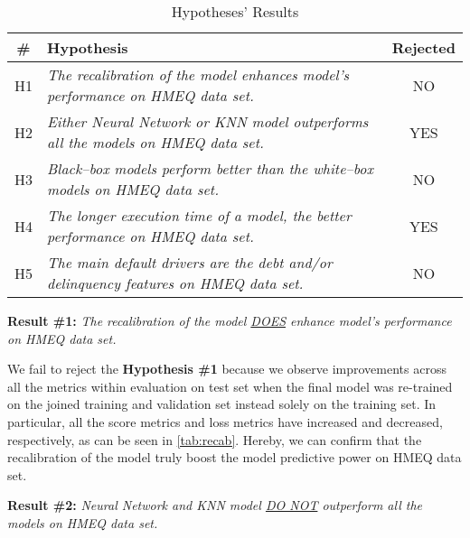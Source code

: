 \begin{table}[H]
    \small
    \setlength{\tabcolsep}{8pt}
    \centering
    \caption[Hypotheses' Results]{Hypotheses' Results}\label{tab:hypoconclusion}
    \renewcommand{\arraystretch}{1.5}
    \begin{tabular}{c p{10cm} c}
    \toprule
    \textbf{\#} & \textbf{Hypothesis} & \textbf{Rejected} \\
    \midrule
    \hline
    H1 & \textit{The recalibration of the model enhances model's performance on HMEQ data set.} & NO \\
    H2 & \textit{Either Neural Network or KNN model outperforms all the models on HMEQ data set.} & YES \\
    H3 & \textit{Black--box models perform better than the white--box models on HMEQ data set.} & NO \\
    H4 & \textit{The longer execution time of a model, the better performance on HMEQ data set.} & YES \\
    H5 & \textit{The main default drivers are the debt and/or delinquency features on HMEQ data set.} & NO \\
    \hline
    \bottomrule
    \end{tabular}
    \vspace{0.35em}
    
    \vspace{-1em}
\end{table}


\noindent \textbf{Result \#1:} \textit{The recalibration of the model \underline{DOES} enhance model's performance on HMEQ data set.}

We fail to reject the \textbf{Hypothesis \#1} because we observe improvements across all the metrics within evaluation on test set when the final model was re-trained on the joined training and validation set instead solely on the training set.
In particular, all the score metrics and loss metrics have increased and decreased, respectively, as can be seen in \autoref{tab:recab}. Hereby, we can confirm that the recalibration of the model truly boost the model predictive power on HMEQ data set.

\vspace{0.3cm}

\newpage
\noindent \textbf{Result \#2:} \textit{Neural Network and KNN model \underline{DO NOT} outperform all the models on HMEQ data set.}

